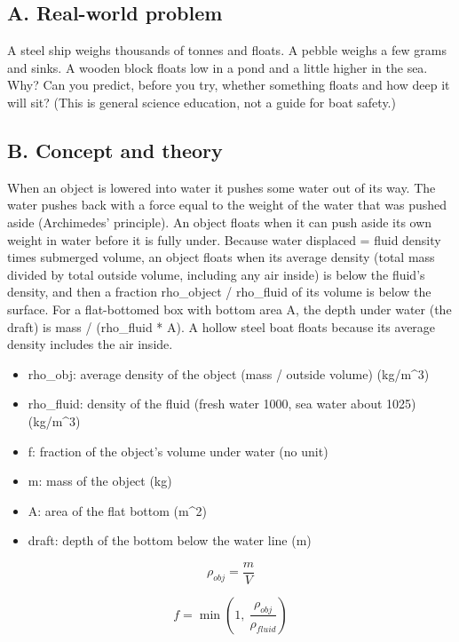 \documentclass[11pt,a4paper]{article}
\begin{document}
\subsection*{A. Real-world problem}
A steel ship weighs thousands of tonnes and floats. A pebble weighs a few grams and sinks. A wooden block floats low in a pond and a little higher in the sea. Why? Can you predict, before you try, whether something floats and how deep it will sit? (This is general science education, not a guide for boat safety.)

\subsection*{B. Concept and theory}
When an object is lowered into water it pushes some water out of its way. The water pushes back with a force equal to the weight of the water that was pushed aside (Archimedes' principle). An object floats when it can push aside its own weight in water before it is fully under. Because water displaced = fluid density times submerged volume, an object floats when its average density (total mass divided by total outside volume, including any air inside) is below the fluid's density, and then a fraction rho\_object / rho\_fluid of its volume is below the surface. For a flat-bottomed box with bottom area A, the depth under water (the draft) is mass / (rho\_fluid * A). A hollow steel boat floats because its average density includes the air inside.

\begin{itemize}[nosep]
\item rho\_obj: average density of the object (mass / outside volume) (kg/m\textasciicircum{}3)
\item rho\_fluid: density of the fluid (fresh water 1000, sea water about 1025) (kg/m\textasciicircum{}3)
\item f: fraction of the object's volume under water (no unit)
\item m: mass of the object (kg)
\item A: area of the flat bottom (m\textasciicircum{}2)
\item draft: depth of the bottom below the water line (m)
\end{itemize}

\begin{equation*}
\rho_{obj}=\frac{m}{V}
\end{equation*}

\begin{equation*}
f=\min\!\left(1,\ \frac{\rho_{obj}}{\rho_{fluid}}\right)
\end{equation*}
\end{document}
